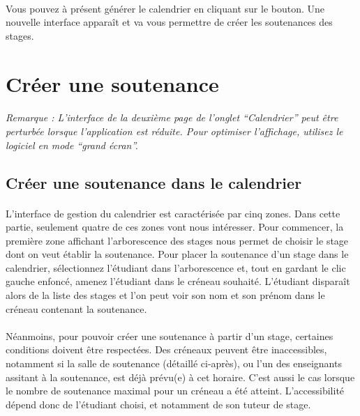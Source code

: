 \documentclass[a4paper,10pt]{book}
\begin{document}
      \paragraph{}
	Vous pouvez à présent générer le calendrier en cliquant sur le bouton.
	Une nouvelle interface apparaît et va vous permettre de créer les soutenances des stages.
      
      
    \section{Créer une soutenance}
    
	\paragraph{}
	  \textit{Remarque : L'interface de la deuxième page de l'onglet ``Calendrier'' peut être perturbée lorsque l'application est réduite. Pour optimiser l'affichage, utilisez le logiciel en mode ``grand écran''.}
    
      \subsection{Créer une soutenance dans le calendrier}
	\paragraph{}
	  L'interface de gestion du calendrier est caractérisée par cinq zones.
	  Dans cette partie, seulement quatre de ces zones vont nous intéresser.
	  Pour commencer, la première zone affichant l'arborescence des stages nous permet de choisir le stage dont on veut établir la soutenance.
	  Pour placer la soutenance d'un stage dans le calendrier, sélectionnez l'étudiant dans l'arborescence et, tout en gardant le clic gauche enfoncé, amenez l'étudiant dans le créneau souhaité.
	  L'étudiant disparaît alors de la liste des stages et l'on peut voir son nom et son prénom dans le créneau contenant la soutenance.
	  
	\paragraph{}
	  Néanmoins, pour pouvoir créer une soutenance à partir d'un stage, certaines conditions doivent être respectées.
	  Des créneaux peuvent être inaccessibles, notamment si la salle de soutenance (détaillé ci-après), ou l'un des enseignants assitant à la soutenance, est déjà prévu(e) à cet horaire.
	  C'est aussi le cas lorsque le nombre de soutenance maximal pour un créneau a été atteint.
	  L'accessibilité dépend donc de l'étudiant choisi, et notamment de son tuteur de stage.
	
\end{document}
